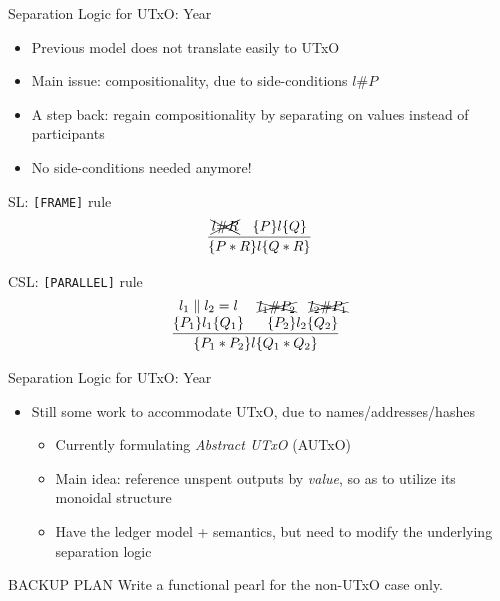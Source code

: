 \documentclass[aspectratio=169]{beamer}
\newenvironment{proposition}[1]
  {\begin{alertblock}{#1}\begin{displaymath}}
  {\end{displaymath}\end{alertblock}}
\renewcommand\alert[1]{\textcolor{mLightBrown}{#1}}
\newcommand\III{\textgoth{III}\xspace}
\newcommand\IV{\textgoth{IV}\xspace}
\begin{document}
\begin{frame}{Separation Logic for UTxO: Year \III}
\begin{itemize}
\item Previous model does not translate easily to UTxO
\item Main issue: compositionality, due to side-conditions $l \# P$
\item A step back: regain compositionality by separating on \alert{values} instead of \alert{participants}
\item No side-conditions needed anymore!
\end{itemize}
\hspace{2cm}
\begin{minipage}{.3\textwidth}
\begin{proposition}{SL: \texttt{[FRAME]} rule}
\infer
  {\{ P * R \} l \{ Q * R \} }
  {%
    \xcancel{l \# R}
  & \{ P \} l \{ Q \}
  }
\end{proposition}
\end{minipage}
\hspace{2cm}
\begin{minipage}{.3\textwidth}
\begin{proposition}{CSL: \texttt{[PARALLEL]} rule}
\infer
  {\{ P_1 * P_2 \} l \{ Q_1 * Q_2 \} }
  { \deduce{\{ P_1 \} l_1 \{ Q_1 \} }
           {l_1 \parallel l_2 = l}
  & \deduce{\{ P_2 \} l_2 \{ Q_2 \} }
           {\xcancel{l_1 \# P_2} \quad \xcancel{l_2 \# P_1}}
  }
\end{proposition}
\end{minipage}
\end{frame}

\begin{frame}{Separation Logic for UTxO: Year \IV}
\begin{itemize}
\item Still some work to accommodate UTxO, due to names/addresses/hashes
  \begin{itemize}
  \item Currently formulating \textit{Abstract UTxO} (AUTxO)
  \item Main idea: reference unspent outputs by \textit{value}, so as to utilize its monoidal structure
  \item Have the ledger model + semantics, but need to modify the underlying separation logic
  \end{itemize}
\end{itemize}
\begin{alertblock}{BACKUP PLAN}
Write a functional pearl for the non-UTxO case only.
\end{alertblock}
\end{frame}
\end{document}

